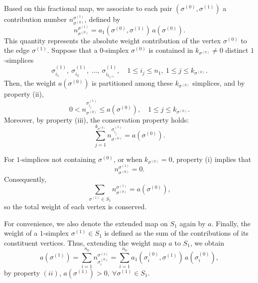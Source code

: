 \documentclass[12pt]{article}
\theoremstyle{normalhead_nobrackets}
\theoremstyle{exampstyle}
\begin{document}
Based on this fractional map, we associate to each pair 
$(\sigma^{(0)}, \sigma^{(1)})$ a contribution number 
$n^{\sigma^{(1)}}_{\sigma^{(0)}}$, defined by
\[
n^{\sigma^{(1)}}_{\sigma^{(0)}}
=
a_1(\sigma^{(0)}, \sigma^{(1)})\, a(\sigma^{(0)}).
\]
This quantity represents the absolute weight contribution of the vertex $\sigma^{(0)}$ to the edge $\sigma^{(1)}$. Suppose that a $0$-simplex $\sigma^{(0)}$ is contained in 
$k_{\sigma^{(0)}} \neq 0$ distinct $1$-simplices
\[
\sigma^{(1)}_{i_1},\ \sigma^{(1)}_{i_2},\ \ldots,\ 
\sigma^{(1)}_{i_{k_{\sigma^{(0)}}}},
\quad
1 \le i_j \le n_1,\ 
1 \le j \le k_{\sigma^{(0)}}.
\]
Then, the weight $a(\sigma^{(0)})$ is partitioned among these 
$k_{\sigma^{(0)}}$ simplices, and by property (ii),
\[
0 < n^{\sigma^{(1)}_{i_j}}_{\sigma^{(0)}} \le a(\sigma^{(0)}),
\quad
1 \le j \le k_{\sigma^{(0)}}.
\]
Moreover, by property (iii), the conservation property holds:
\[
\sum_{j=1}^{k_{\sigma^{(0)}}}
n^{\sigma^{(1)}_{i_j}}_{\sigma^{(0)}}
=
a(\sigma^{(0)}).
\]

For $1$-simplices not containing $\sigma^{(0)}$, or when 
$k_{\sigma^{(0)}} = 0$, property (i) implies that
\[
n^{\sigma^{(1)}}_{\sigma^{(0)}} = 0.
\]
Consequently,
\[
\sum_{\sigma^{(1)} \in S_1}
n^{\sigma^{(1)}}_{\sigma^{(0)}}
=
a(\sigma^{(0)}),
\]
so the total weight of each vertex is conserved.


For convenience, we also denote the extended map on $S_1$ again by $a$. Finally, the weight of a $1$-simplex $\sigma^{(1)} \in S_1$ is defined as the sum of the contributions of its constituent vertices. Thus, extending the weight map $a$ to $S_1$, we obtain
\[
a(\sigma^{(1)})
=
\sum_{i=1}^{n_0}
n_{\sigma^{(0)}_i}^{\sigma^{(1)}}
=
\sum_{i=1}^{n_0}
a_1(\sigma^{(0)}_i, \sigma^{(1)}) \, a(\sigma^{(0)}_i),
\]
by property $(ii)$, $a(\sigma^{(1)}) > 0, \ \forall \sigma^{(1)} \in S_1$.
\end{document}
